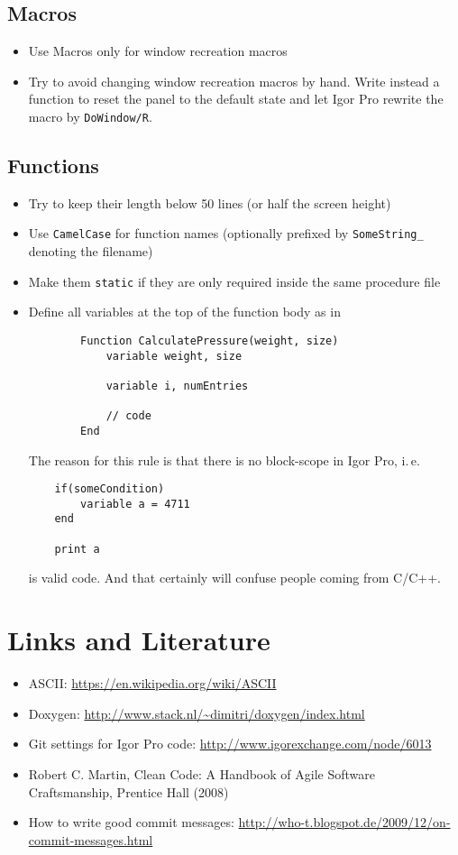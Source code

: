 \documentclass{scrartcl}
\begin{document}
\subsection{Macros}
\begin{itemize}
	\item Use Macros only for window recreation macros
%
	\item Try to avoid changing window recreation macros by hand. Write instead a function to reset the panel to 
	      the default state and let Igor Pro rewrite the macro by \texttt{DoWindow/R}.
\end{itemize}
%
\subsection{Functions}
\begin{itemize}
	\item Try to keep their length below 50 lines (or half the screen height)
%	
	\item Use \texttt{CamelCase} for function names (optionally prefixed by \texttt{SomeString_} denoting the filename)
%	
	\item Make them \texttt{static} if they are only required inside the same procedure file
%	
	\item Define all variables at the top of the function body as in
	\begin{verbatim}
		Function CalculatePressure(weight, size)
			variable weight, size
			
			variable i, numEntries
			
			// code
		End
	\end{verbatim}
	The reason for this rule is that there is no block-scope in Igor Pro, i.\,e.
	\begin{verbatim}
	if(someCondition)
		variable a = 4711
	end
	
	print a
	\end{verbatim}
	is valid code. And that certainly will confuse people coming from C/C++.
\end{itemize}
%
\section{Links and Literature}
%
\begin{itemize}
	\item ASCII: \url{https://en.wikipedia.org/wiki/ASCII}
%	
	\item Doxygen: \url{http://www.stack.nl/~dimitri/doxygen/index.html}
%	
	\item Git settings for Igor Pro code: \url{http://www.igorexchange.com/node/6013}
%	
	\item Robert C. Martin, Clean Code: A Handbook of Agile Software Craftsmanship, Prentice Hall (2008)
%	
	\item How to write good commit messages: \url{http://who-t.blogspot.de/2009/12/on-commit-messages.html}
\end{itemize}
%	
\end{document}
